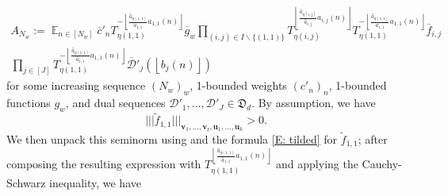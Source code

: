\documentclass[11pt]{amsart}
\theoremstyle{definition}
\DeclareMathOperator*{\E}{\mathbb{E}}
\newcommand{\bu}{{\mathbf{u}}}
\newcommand{\bv}{{\mathbf{v}}}
\newcommand{\um}{{\underline{m}}}
\newcommand{\nnorm}[1]{\lvert\!|\!| #1|\!|\!\rvert}
\newcommand{\1}{{\mathbf{1}}}
\newcommand{\floor}[1]{{\left \lfloor #1 \right \rfloor}}
\begin{document}
\begin{multline}\label{E: tilded}
             A_{N_{w}}:=\E_{n\in[N_{w}]} \overline{c}'_{n}T_{\eta(1,1)}^{-\floor{\frac{\hat{a}_{\eta(1,1)}}{\hat{a}_{1,1}}a_{1,1}(n)}}\overline{g}_{w}\prod_{(i,j)\in I\backslash\{(1,1)\}}T_{\eta(i,j)}^{\floor{\frac{\hat{a}_{\eta(i,j)}}{\hat{a}_{i,j}}a_{i,j}(n)}}T_{\eta(1,1)}^{-\floor{\frac{\hat{a}_{\eta(1,1)}}{\hat{a}_{1,1}}a_{1,1}(n)}}\overline{f}_{i,j}\\
         \prod_{j\in [J]}T_{\eta(1,1)}^{-\floor{\frac{\hat{a}_{\eta(1,1)}}{\hat{a}_{1,1}}a_{1,1}(n)}}\overline{\mathcal{D}}'_{j}(\floor{b_{j}(n)})
\end{multline}
     for some increasing sequence $(N_{w})_{w}$,  1-bounded weights $(c'_{n})_n$,  1-bounded functions $g_{w}$, and dual sequences $\mathcal{D}'_{1},\dots,\mathcal{D}'_{J}\in\mathfrak{D}_{d}$. %
     By assumption, we have $$\nnorm{\tilde{f}_{1,1}}_{\bv_{1},\dots,\bv_{t},\bu_{1},\dots,\bu_k}>0.$$
      We then unpack this seminorm using \cite[Lemma 11.11]{DKKST24} and the formula \eqref{E: tilded} for $\tilde{f}_{1,1}$; after composing the resulting expression with $T_{\eta(1,1)}^{\floor{\frac{\hat{a}_{\eta(1,1)}}{\hat{a}_{1,1}}a_{1,1}(n)}}$ and applying the Cauchy-Schwarz inequality, we have  
\end{document}

